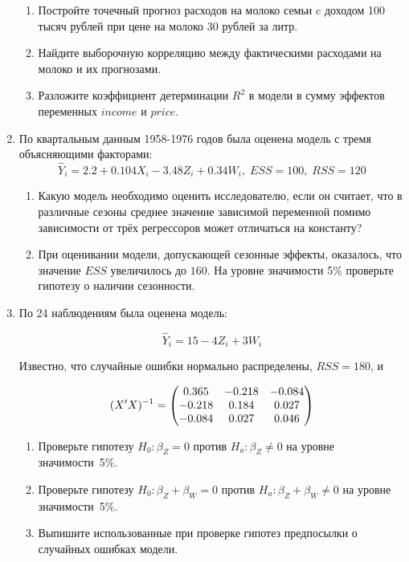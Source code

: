 \documentclass[12pt, a4paper]{article}\usepackage[]{graphicx}\usepackage[]{color}
\begin{document}
\begin{enumerate}
\begin{enumerate}
\item Постройте точечный прогноз расходов на молоко семьи c доходом 100 тысяч рублей при цене на молоко 30 рублей за литр.
\item Найдите выборочную корреляцию между фактическими расходами на молоко и их прогнозами.
\item Разложите коэффициент детерминации $R^2$ в модели в сумму эффектов переменных $income$ и $price$.
\end{enumerate}




\item По квартальным данным 1958-1976 годов была оценена модель с тремя объясняющими факторами:
\[
\hat Y_i = 2.2 + 0.104 X_i - 3.48 Z_i + 0.34 W_i, \; ESS = 100, \; RSS = 120
\]

\begin{enumerate}
\item Какую модель необходимо оценить исследователю, если он считает, что в различные сезоны среднее значение зависимой переменной помимо зависимости от трёх регрессоров может отличаться на константу?
\item При оценивании модели, допускающей сезонные эффекты, оказалось, что значение $ESS$ увеличилось до $160$.
На уровне значимости 5\% проверьте гипотезу о наличии сезонности.
\end{enumerate}



\item По 24 наблюдениям была оценена модель:

\[
\widehat{Y}_i=15-4Z_i+3W_i
\]

Известно, что случайные ошибки нормально распределены, $RSS=180$, и

\[
(X'X)^{-1} =
\ensuremath{%
\begin{pmatrix}{}
  0.365 & -0.218 & -0.084 \\ 
  -0.218 & 0.184 & 0.027 \\ 
  -0.084 & 0.027 & 0.046 \\ 
  \end{pmatrix}
}
\]


\begin{enumerate}
\item Проверьте гипотезу $H_0: \beta_Z = 0$ против $H_a: \beta_Z \neq 0$ на уровне значимости~5\%.
\item Проверьте гипотезу $H_0: \beta_Z + \beta_W = 0$  против $H_a: \beta_Z + \beta_W \neq 0$ на уровне значимости~5\%.
\item Выпишите использованные при проверке гипотез предпосылки о случайных ошибках модели.
\end{enumerate}


\end{enumerate}
\end{document}

